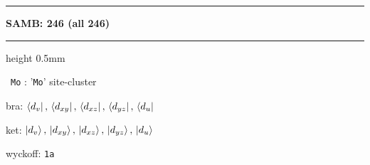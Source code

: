 \documentclass[fleqn,10pt,landscape]{jsarticle}
\begin{document}
\vspace{5mm}
\noindent \rule[0.5mm]{5mm}{0.5mm}\hspace{3mm}\textbf{SAMB: 246 (all 246)}\hspace{3mm}\leaders\hrule height 0.5mm\hfill\kern0pt
\vspace{3mm}

\vspace{5mm}

\noindent\textbullet\, \texttt{Mo} : '\texttt{Mo}' site-cluster

\noindent\quad * bra: $\bra{d_{v}},\, \bra{d_{xy}},\, \bra{d_{xz}},\, \bra{d_{yz}},\, \bra{d_{u}}$

\noindent\quad * ket: $\ket{d_{v}},\, \ket{d_{xy}},\, \ket{d_{xz}},\, \ket{d_{yz}},\, \ket{d_{u}}$

\noindent\quad * wyckoff: \texttt{1a}
\end{document}
